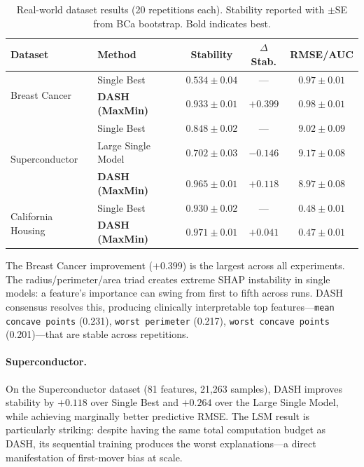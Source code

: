 \documentclass[11pt]{article}
\newcommand{\dash}{\textsc{DASH}}
\begin{document}
\begin{table}[h]
\centering
\caption{Real-world dataset results (20 repetitions each).
Stability reported with $\pm$SE from BCa bootstrap. Bold indicates best.}
\label{tab:realworld}
\begin{tabular}{llccc}
\toprule
\textbf{Dataset} & \textbf{Method} & \textbf{Stability} & \textbf{$\Delta$Stab.} & \textbf{RMSE/AUC} \\
\midrule
\multirow{2}{*}{Breast Cancer}
  & Single Best            & $0.534 \pm 0.04$ & ---    & $0.97 \pm 0.01$ \\
  & \textbf{DASH (MaxMin)} & $\mathbf{0.933} \pm 0.01$ & $+0.399$ & $\mathbf{0.98} \pm 0.01$ \\
\midrule
\multirow{3}{*}{Superconductor}
  & Single Best            & $0.848 \pm 0.02$ & ---    & $9.02 \pm 0.09$ \\
  & Large Single Model     & $0.702 \pm 0.03$ & $-0.146$ & $9.17 \pm 0.08$ \\
  & \textbf{DASH (MaxMin)} & $\mathbf{0.965} \pm 0.01$ & $+0.118$ & $\mathbf{8.97} \pm 0.08$ \\
\midrule
\multirow{2}{*}{California Housing}
  & Single Best            & $0.930 \pm 0.02$ & ---    & $0.48 \pm 0.01$ \\
  & \textbf{DASH (MaxMin)} & $\mathbf{0.971} \pm 0.01$ & $+0.041$ & $\mathbf{0.47} \pm 0.01$ \\
\bottomrule
\end{tabular}
\end{table}

The Breast Cancer improvement ($+0.399$) is the largest across all
experiments. The radius/perimeter/area triad creates extreme SHAP
instability in single models: a feature's importance can swing from
first to fifth across runs. \dash{} consensus resolves this, producing
clinically interpretable top features---\texttt{mean concave points}
(0.231), \texttt{worst perimeter} (0.217), \texttt{worst concave points}
(0.201)---that are stable across repetitions.

\paragraph{Superconductor.}
On the Superconductor dataset (81 features, 21,263 samples), \dash{}
improves stability by $+0.118$ over Single Best and $+0.264$ over the
Large Single Model, while achieving marginally better predictive RMSE.
The LSM result is particularly striking: despite having the same total
computation budget as \dash{}, its sequential training produces the
worst explanations---a direct manifestation of first-mover bias at scale.
\end{document}
